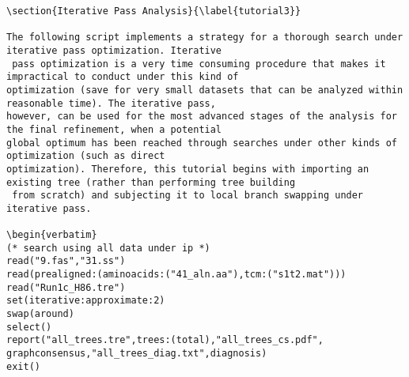 \begin{verbatim}
\section{Iterative Pass Analysis}{\label{tutorial3}}

The following script implements a strategy for a thorough search under iterative pass optimization. Iterative
 pass optimization is a very time consuming procedure that makes it impractical to conduct under this kind of 
optimization (save for very small datasets that can be analyzed within reasonable time). The iterative pass, 
however, can be used for the most advanced stages of the analysis for the final refinement, when a potential 
global optimum has been reached through searches under other kinds of optimization (such as direct 
optimization). Therefore, this tutorial begins with importing an existing tree (rather than performing tree building
 from scratch) and subjecting it to local branch swapping under iterative pass.

\begin{verbatim}
(* search using all data under ip *)
read("9.fas","31.ss")
read(prealigned:(aminoacids:("41_aln.aa"),tcm:("s1t2.mat")))
read("Run1c_H86.tre")
set(iterative:approximate:2)
swap(around)
select()
report("all_trees.tre",trees:(total),"all_trees_cs.pdf",
graphconsensus,"all_trees_diag.txt",diagnosis)
exit()
\end{verbatim}

